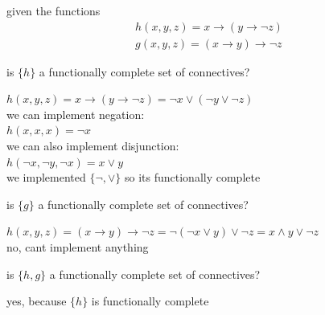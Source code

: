 \documentclass[a4paper,12pt]{article}
\begin{document}
\begin{question}
given the functions\\
\begin{gather*}
  h(x,y,z) = x \to (y \to \lnot z)\\
  g(x,y,z) = (x \to y) \to \lnot z
\end{gather*}
\begin{subquestion}
is \(\{h\}\) a functionally complete set of connectives?\\
\begin{answer}
\(h(x,y,z) = x \to (y \to \lnot z) = \lnot x \lor (\lnot y \lor \lnot z)\)\\
we can implement negation:\\
\(h(x,x,x) = \lnot x\)\\
we can also implement disjunction:\\
\(h(\lnot x, \lnot y, \lnot x) = x \lor y\)\\
we implemented \(\{\lnot, \lor\}\) so its functionally complete\\
\end{answer}
\end{subquestion}
\begin{subquestion}
is \(\{g\}\) a functionally complete set of connectives?\\
\begin{answer}
\(h(x,y,z) = (x \to y) \to \lnot z = \lnot (\lnot x \lor y) \lor \lnot z = x \land y \lor \lnot z\)\\
no, cant implement anything\\
\end{answer}
\end{subquestion}
\begin{subquestion}
is \(\{h,g\}\) a functionally complete set of connectives?\\
\begin{answer}
yes, because \(\{h\}\) is functionally complete\\
\end{answer}
\end{subquestion}
\end{question}
\end{document}
